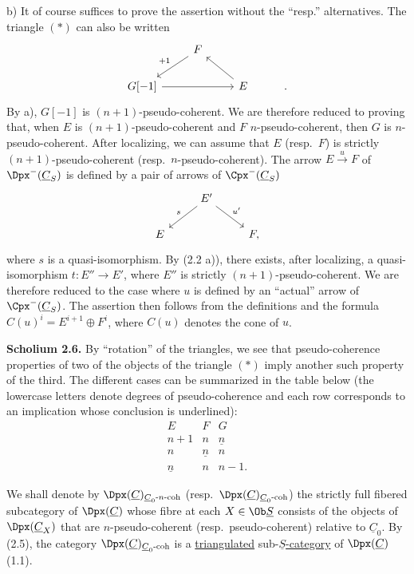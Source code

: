b) It of course suffices to prove the assertion without the ``resp.'' alternatives. The triangle \((*)\) can also be written
\[
\begin{tikzcd}
& F \arrow[dl,"+1"'] & \\
G[-1] \arrow[rr] && E \arrow[ul] & .
\end{tikzcd}
\]
By a), \(G[-1]\) is \((n+1)\)-pseudo-coherent. We are therefore reduced to proving that, when \(E\) is \((n+1)\)-pseudo-coherent and \(F\) \(n\)-pseudo-coherent, then \(G\) is \(n\)-pseudo-coherent. After localizing, we can assume that \(E\) (resp.\ \(F\)) is strictly \((n+1)\)-pseudo-coherent (resp.\ \(n\)-pseudo-coherent). The arrow \(E\xrightarrow{u}F\) of \(\Dpx^-(\underline{C}_S)\) is defined by a pair of arrows of \(\Cpx^-(\underline{C}_S)\)
\[
\begin{tikzcd}
& E' \arrow[dl,"s"'] \arrow[dr,"u'"]\\
E && F ,
\end{tikzcd}
\]
where \(s\) is a quasi-isomorphism. By (2.2 a)), there exists, after localizing, a quasi-isomorphism \(t:E''\to E'\), where \(E''\) is strictly \((n+1)\)-pseudo-coherent. We are therefore reduced to the case where \(u\) is defined by an
%
``actual'' arrow of \(\Cpx^-(\underline{C}_S)\). The assertion then follows from the definitions and the formula \(C(u)^i=E^{i+1}\oplus F^i\), where \(C(u)\) denotes the cone of \(u\).

\textbf{Scholium 2.6.} By ``rotation'' of the triangles, we see that pseudo-coherence properties of two of the objects of the triangle \((*)\) imply another such property of the third. The different cases can be summarized in the table below (the lowercase letters denote degrees of pseudo-coherence and each row corresponds to an implication whose conclusion is underlined):
\[
\begin{array}{ccc}
E&F&G\\[0.2em]
n+1&n&\underline n\\
n&\underline n&n\\
\underline n&n&n-1 .
\end{array}
\]

We shall denote by \(\Dpx(\underline{C})_{\underline{C}_0\text{-}n\text{-coh}}\) (resp.\ \(\Dpx(\underline{C})_{\underline{C}_0\text{-}\mathrm{coh}}\)) the strictly full fibered subcategory of \(\Dpx(\underline{C})\) whose fibre at each \(X\in\Ob \underline{S}\) consists of the objects of \(\Dpx(\underline{C}_X)\) that are \(n\)-pseudo-coherent (resp.\ pseudo-coherent) relative to \(\underline{C}_0\). By (2.5), the category \(\Dpx(\underline{C})_{\underline{C}_0\text{-}\mathrm{coh}}\) is a \uline{triangulated} sub-\(\underline{S}\)\uline{-category} of \(\Dpx(\underline{C})\) (1.1).

